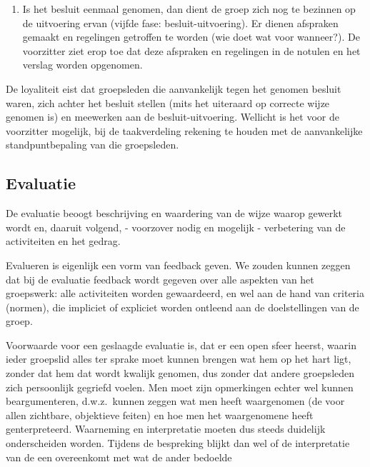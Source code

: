 \begin{enumerate}
\item    Is het besluit eenmaal genomen, dan dient de groep zich
     nog te bezinnen op de uitvoering ervan (vijfde fase:
     besluit-uitvoering). Er dienen afspraken gemaakt en regelingen getroffen te worden (wie doet wat voor wanneer?).
     De voorzitter ziet erop toe dat deze afspraken en regelingen in de notulen en het verslag worden opgenomen.
\end{enumerate}
     De loyaliteit eist dat groepsleden die aanvankelijk tegen
     het genomen besluit waren, zich achter het besluit stellen (mits het uiteraard op correcte wijze genomen is) en
     meewerken aan de besluit-uitvoering. Wellicht is het voor
     de voorzitter mogelijk, bij de taakverdeling rekening te
     houden met de aanvankelijke standpuntbepaling van die
     groepsleden.

\subsection{Evaluatie}

De evaluatie beoogt beschrijving en waardering van de wijze
waarop gewerkt wordt en, daaruit volgend, - voorzover nodig en
mogelijk - verbetering van de activiteiten en het gedrag.

Evalueren is eigenlijk een vorm van feedback geven.
We zouden kunnen zeggen dat bij de evaluatie feedback wordt
gegeven over alle aspekten van het groepswerk: alle activiteiten worden gewaardeerd,
en wel aan de hand van criteria (normen),
die impliciet of expliciet worden ontleend aan de doel\-stel\-ling\-en van de groep.

Voorwaarde voor een geslaagde evaluatie is, dat er een open
sfeer heerst, waarin ieder groepslid alles ter sprake moet
kunnen brengen wat hem op het hart ligt, zonder dat hem dat
wordt kwalijk genomen, dus zonder dat andere groepsleden zich
persoonlijk gegriefd voelen. Men moet zijn opmerkingen echter
wel kunnen beargumenteren, d.w.z.\ kunnen zeggen wat men heeft
waargenomen (de voor allen zichtbare, objektieve feiten) en
hoe men het waargenomene heeft ge{\ii}nterpreteerd.
Waarneming en interpretatie moeten dus steeds duidelijk onderscheiden worden. Tijdens de bespreking blijkt dan wel of de
interpretatie van de een overeenkomt met wat de ander bedoelde

\cleardoublepage
